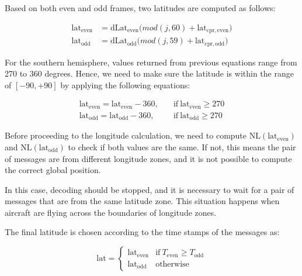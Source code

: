 Based on both even and odd frames, two latitudes are computed as follows:

\begin{equation}
  \begin{split}
    \mathrm{lat}_\mathrm{even} &= \mathrm{dLat}_\mathrm{even} \Big( mod(j, 60) + \mathrm{lat}_\mathrm{cpr, even} \Big) \\
    \mathrm{lat}_\mathrm{odd} &= \mathrm{dLat}_\mathrm{odd} \Big( mod(j, 59) + \mathrm{lat}_\mathrm{cpr,odd} \Big)
  \end{split}
\end{equation}


For the southern hemisphere, values returned from previous equations range from 270 to 360 degrees. Hence, we need to make sure the latitude is within the range of $[-90, +90]$ by applying the following equations:

\begin{equation}
  \begin{split}
    \mathrm{lat}_\mathrm{even} = \mathrm{lat}_\mathrm{even} - 360,  \quad &\text{if}~\mathrm{lat}_\mathrm{even} \ge 270 \\
    \mathrm{lat}_\mathrm{odd} = \mathrm{lat}_\mathrm{odd} - 360,  \quad &\text{if}~\mathrm{lat}_\mathrm{odd} \ge 270
  \end{split}
\end{equation}


Before proceeding to the longitude calculation, we need to compute $\mathrm{NL}(\mathrm{lat}_\mathrm{even})$ and $\mathrm{NL}(\mathrm{lat}_\mathrm{odd})$ to check if both values are the same. If not, this means the pair of messages are from different longitude zones, and it is not possible to compute the correct global position.

In this case, decoding should be stopped, and it is necessary to wait for a pair of messages that are from the same latitude zone. This situation happens when aircraft are flying across the boundaries of longitude zones.


The final latitude is chosen according to the time stamps of the messages as:

\begin{equation}
  \mathrm{lat} =
  \begin{cases}
   \mathrm{lat}_\mathrm{even}     & \text{if}~T_\mathrm{even} \ge T_\mathrm{odd} \\
   \mathrm{lat}_\mathrm{odd}     & \text{otherwise}
  \end{cases}
\end{equation}

